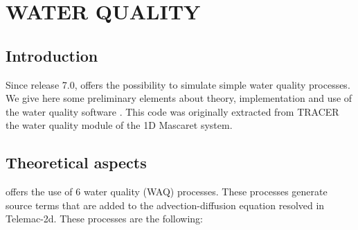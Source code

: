 \chapter{WATER QUALITY}
\label{ch:wat:qual}

\section{  Introduction}

 Since release 7.0,  offers the possibility to simulate simple water quality processes. We give here some preliminary elements about theory, implementation and use of the water quality software \waqtel. This code was originally extracted from TRACER the water quality module of the 1D Mascaret system.

\section{ Theoretical aspects}

 \waqtel offers the use of 6 water quality (WAQ) processes. These processes generate source terms that are added to the advection-diffusion equation resolved in Telemac-2d. These processes are the following:

